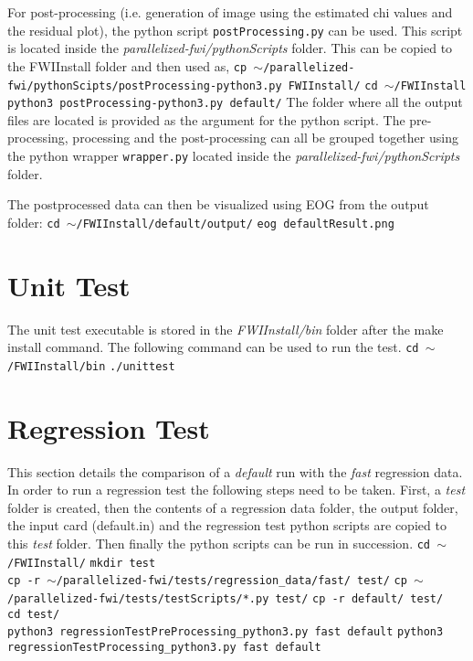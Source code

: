 \documentclass[10pt]{article}
\begin{document}
\newpage
\noindent For post-processing (i.e. generation of image using the estimated chi values and the residual plot), the python script \texttt{postProcessing.py} can be used. This script is located inside the \textit{parallelized-fwi/pythonScripts} folder. This can be copied to the FWIInstall folder and then used as,
\newline
\texttt{cp $\sim$/parallelized-fwi/pythonScipts/postProcessing-python3.py FWIInstall/}
\newline
\texttt{cd $\sim$/FWIInstall}
\newline
\texttt{python3 postProcessing-python3.py default/}
\newline
The folder where all the output files are located is provided as the argument for the python script. The pre-processing, processing and the post-processing can all be grouped together using the python wrapper \texttt{wrapper.py} located inside the \textit{parallelized-fwi/pythonScripts} folder.

\noindent The postprocessed data can then be visualized using EOG from the output folder:
\newline
\texttt{cd $\sim$/FWIInstall/default/output/}
\newline
\texttt{eog defaultResult.png}
\newline
 
\section{Unit Test}

The unit test executable is stored in the \textit{FWIInstall/bin} folder after the make install command. The following command can be used to run the test.
\newline
\texttt{cd $\sim$/FWIInstall/bin}
\newline
\texttt{./unittest}


\section{Regression Test}

This section details the comparison of a \textit{default} run with the \textit{fast} regression data. In order to run a regression test the following steps need to be taken. First, a \textit{test} folder is created, then the contents of a regression data folder, the output folder, the input card (default.in) and the regression test python scripts are copied to this \textit{test} folder. Then finally the python scripts can be run in succession.  
\newline
\texttt{cd $\sim$/FWIInstall/}
\newline
\texttt{mkdir test}
\\
\texttt{cp -r $\sim$/parallelized-fwi/tests/regression\_data/fast/ test/}
\newline
\texttt{cp $\sim$/parallelized-fwi/tests/testScripts/*.py test/}
\newline
\texttt{cp -r default/ test/}
\\
\texttt{cd test/}
\\
\texttt{python3 regressionTestPreProcessing\_python3.py fast default}
\newline
\texttt{python3 regressionTestProcessing\_python3.py fast default}
\end{document}
